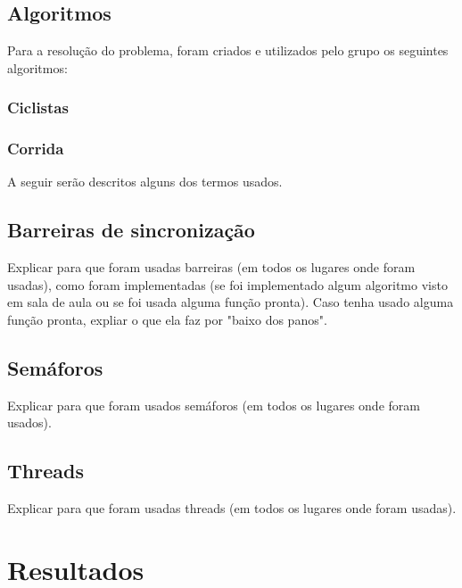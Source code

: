 \documentclass[12pt,a4paper]{article}
\begin{document}
\subsection{Algoritmos}

	Para a resolução do problema, foram criados e utilizados pelo grupo os seguintes algoritmos:
    
\subsubsection{Ciclistas}

\subsubsection{Corrida}

	A seguir serão descritos alguns dos termos usados.
    
\subsection{Barreiras de sincronização}

Explicar para que foram usadas barreiras (em todos os lugares onde
foram usadas), como foram implementadas (se foi implementado algum
algoritmo visto em sala de aula ou se foi usada alguma função pronta).
Caso tenha usado alguma função pronta, expliar o que ela faz por
"baixo dos panos".

\subsection{Semáforos}

Explicar para que foram usados semáforos (em todos os lugares onde
foram usados).

\subsection{Threads}

Explicar para que foram usadas threads (em todos os lugares onde foram
usadas).

\section{Resultados}
\end{document}

